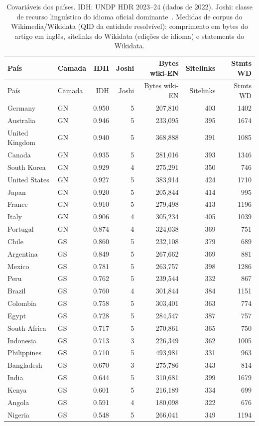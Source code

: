 \begin{longtable}{llrrrrr}
\caption{Covariáveis dos países. IDH: UNDP HDR 2023--24 (dados de 2022). Joshi: classe de recurso linguístico do idioma oficial dominante~\citep{joshi2020state}. Medidas de corpus do Wikimedia/Wikidata (QID da entidade resolvível): comprimento em bytes do artigo em inglês, sitelinks do Wikidata (edições de idioma) e statements do Wikidata.\label{tab:s-covariates}}\\
\toprule
País & Camada & IDH & Joshi & Bytes wiki-EN & Sitelinks & Stmts WD \\
\midrule \endfirsthead
\toprule País & Camada & IDH & Joshi & Bytes wiki-EN & Sitelinks & Stmts WD \\ \midrule \endhead
Germany & GN & 0.950 & 5 & 207,810 & 403 & 1402 \\
Australia & GN & 0.946 & 5 & 233,095 & 395 & 1674 \\
United Kingdom & GN & 0.940 & 5 & 368,888 & 391 & 1085 \\
Canada & GN & 0.935 & 5 & 281,016 & 393 & 1346 \\
South Korea & GN & 0.929 & 4 & 275,291 & 350 & 746 \\
United States & GN & 0.927 & 5 & 383,914 & 424 & 1710 \\
Japan & GN & 0.920 & 5 & 205,844 & 414 & 995 \\
France & GN & 0.910 & 5 & 279,498 & 413 & 1196 \\
Italy & GN & 0.906 & 4 & 305,234 & 405 & 1039 \\
Portugal & GN & 0.874 & 4 & 324,038 & 369 & 751 \\
Chile & GS & 0.860 & 5 & 232,108 & 379 & 689 \\
Argentina & GS & 0.849 & 5 & 267,662 & 369 & 881 \\
Mexico & GS & 0.781 & 5 & 263,757 & 398 & 1286 \\
Peru & GS & 0.762 & 5 & 239,544 & 332 & 867 \\
Brazil & GS & 0.760 & 4 & 301,844 & 384 & 1151 \\
Colombia & GS & 0.758 & 5 & 303,401 & 363 & 774 \\
Egypt & GS & 0.728 & 5 & 284,547 & 387 & 757 \\
South Africa & GS & 0.717 & 5 & 270,861 & 365 & 750 \\
Indonesia & GS & 0.713 & 3 & 226,349 & 362 & 1005 \\
Philippines & GS & 0.710 & 5 & 493,981 & 331 & 963 \\
Bangladesh & GS & 0.670 & 3 & 275,786 & 343 & 814 \\
India & GS & 0.644 & 5 & 310,681 & 399 & 1679 \\
Kenya & GS & 0.601 & 5 & 216,189 & 334 & 699 \\
Angola & GS & 0.591 & 4 & 180,098 & 322 & 676 \\
Nigeria & GS & 0.548 & 5 & 266,041 & 349 & 1194 \\
\bottomrule
\end{longtable}
